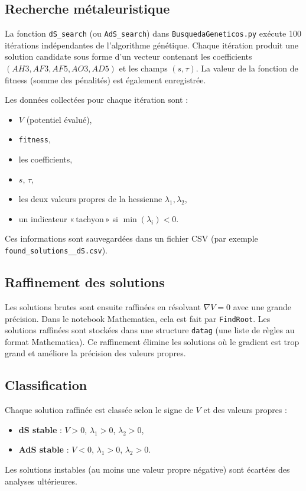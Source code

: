 \documentclass[a4paper,12pt]{article}
\begin{document}
\subsection{Recherche métaleuristique}
La fonction \texttt{dS\_search} (ou \texttt{AdS\_search}) dans \texttt{BusquedaGeneticos.py} exécute 100 itérations indépendantes de l'algorithme génétique. Chaque itération produit une solution candidate sous forme d'un vecteur contenant les coefficients $(AH3, AF3, AF5, AO3, AD5)$ et les champs $(s,\tau)$. La valeur de la fonction de fitness (somme des pénalités) est également enregistrée.

Les données collectées pour chaque itération sont :
\begin{itemize}
    \item $V$ (potentiel évalué),
    \item \texttt{fitness},
    \item les coefficients,
    \item $s$, $\tau$,
    \item les deux valeurs propres de la hessienne $\lambda_1,\lambda_2$,
    \item un indicateur « tachyon » si $\min(\lambda_i) < 0$.
\end{itemize}
Ces informations sont sauvegardées dans un fichier CSV (par exemple \texttt{found\_solutions\_\_dS.csv}).

\subsection{Raffinement des solutions}
Les solutions brutes sont ensuite raffinées en résolvant $\nabla V = 0$ avec une grande précision. Dans le notebook Mathematica, cela est fait par \texttt{FindRoot}. Les solutions raffinées sont stockées dans une structure \texttt{datag} (une liste de règles au format Mathematica). Ce raffinement élimine les solutions où le gradient est trop grand et améliore la précision des valeurs propres.

\subsection{Classification}
Chaque solution raffinée est classée selon le signe de $V$ et des valeurs propres :
\begin{itemize}
    \item \textbf{dS stable} : $V > 0$, $\lambda_1 > 0$, $\lambda_2 > 0$,
    \item \textbf{AdS stable} : $V < 0$, $\lambda_1 > 0$, $\lambda_2 > 0$.
\end{itemize}
Les solutions instables (au moins une valeur propre négative) sont écartées des analyses ultérieures.
\end{document}
